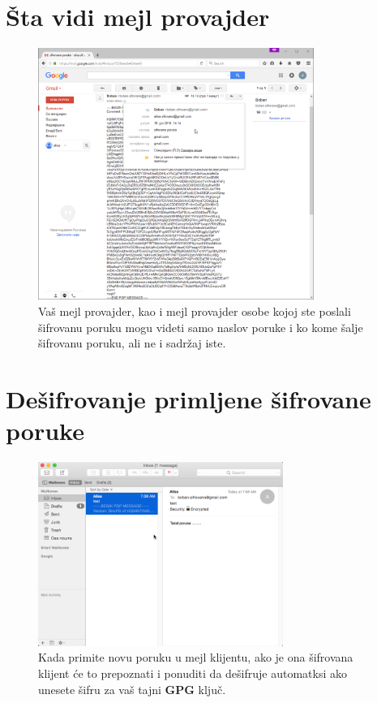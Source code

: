 \documentclass[a4paper,11pt]{article}
\begin{document}
\section{\v{S}ta vidi mejl provajder}
\begin{figure}[!h]
	\begin{center}
		\includegraphics[width=9cm]{25_Oracle_VM_VirtualBox.png}
		\caption{Va\v{s} mejl provajder, kao i mejl provajder osobe kojoj ste poslali \v{s}ifrovanu poruku mogu videti samo naslov poruke i ko kome \v{s}alje \v{s}ifrovanu poruku, ali ne i sadr\v{z}aj iste.}
		\label{gpgtools_email_setup15}
	\end{center}
\end{figure}
\newpage
\section{De\v{s}ifrovanje primljene \v{s}ifrovane poruke}
\begin{figure}[!h]
	\begin{center}
		\includegraphics[width=8cm]{26_Oracle_VM_VirtualBox.png}
		\caption{Kada primite novu poruku u mejl klijentu, ako je ona \v{s}ifrovana klijent \'{c}e to prepoznati i ponuditi da de\v{s}ifruje automatksi ako unesete \v{s}ifru za va\v{s} tajni \textbf{GPG} klju\v{c}.}
		\label{gpgtools_email_setup16}
	\end{center}
\end{figure}
\end{document}
